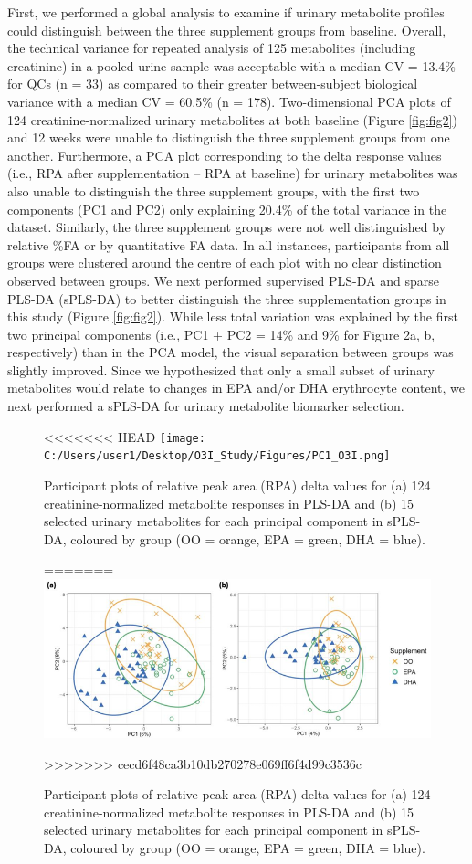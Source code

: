 \documentclass[journal=jacsat,manuscript=article]{achemso}
\begin{document}
First, we performed a global analysis to examine if urinary metabolite
profiles could distinguish between the three supplement groups from
baseline. Overall, the technical variance for repeated analysis of 125
metabolites (including creatinine) in a pooled urine sample was
acceptable with a median CV = 13.4\% for QCs (n = 33) as compared to
their greater between-subject biological variance with a median CV =
60.5\% (n = 178). Two-dimensional PCA plots of 124 creatinine-normalized
urinary metabolites at both baseline (Figure \ref{fig:fig2}) and 12
weeks were unable to distinguish the three supplement groups from one
another. Furthermore, a PCA plot corresponding to the delta response
values (i.e., RPA after supplementation -- RPA at baseline) for urinary
metabolites was also unable to distinguish the three supplement groups,
with the first two components (PC1 and PC2) only explaining 20.4\% of
the total variance in the dataset. Similarly, the three supplement
groups were not well distinguished by relative \%FA or by quantitative
FA data. In all instances, participants from all groups were clustered
around the centre of each plot with no clear distinction observed
between groups. We next performed supervised PLS-DA and sparse PLS-DA
(sPLS-DA) to better distinguish the three supplementation groups in this
study (Figure \ref{fig:fig2}). While less total variation was explained
by the first two principal components (i.e., PC1 + PC2 = 14\% and 9\%
for Figure 2a, b, respectively) than in the PCA model, the visual
separation between groups was slightly improved. Since we hypothesized
that only a small subset of urinary metabolites would relate to changes
in EPA and/or DHA erythrocyte content, we next performed a sPLS-DA for
urinary metabolite biomarker selection.

\begin{figure}
<<<<<<< HEAD
\centering
\texttt{[image: C:/Users/user1/Desktop/O3I\_Study/Figures/PC1\_O3I.png]}
\caption{Participant plots of relative peak area (RPA) delta values for
(a) 124 creatinine-normalized metabolite responses in PLS-DA and (b) 15
selected urinary metabolites for each principal component in sPLS-DA,
coloured by group (OO = orange, EPA = green, DHA =
blue).}\label{fig:fig2}
=======
\includegraphics[width=0.8\linewidth]{../Figures/PC1_O3I} \caption{Participant plots of relative peak area (RPA) delta values for (a) 124 creatinine-normalized metabolite responses in PLS-DA and (b) 15 selected urinary metabolites for each principal component in sPLS-DA, coloured by group (OO = orange, EPA = green, DHA = blue).}\label{fig:unnamed-chunk-2}
>>>>>>> cecd6f48ca3b10db270278e069ff6f4d99c3536c
\end{figure}
\end{document}
